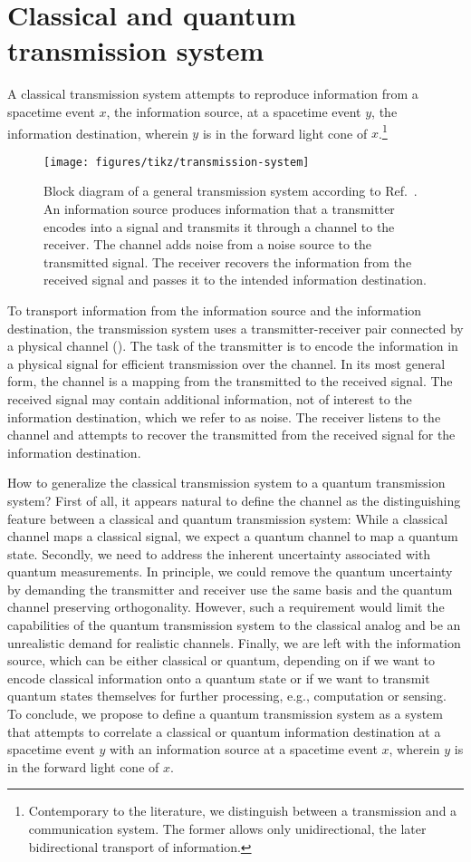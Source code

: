 \section{Classical and quantum transmission system}

A classical transmission system attempts to reproduce information from a spacetime event $x$, the information source, at a spacetime event $y$, the information destination, wherein $y$ is in the forward light cone of $x$.\footnote{Contemporary to the literature, we distinguish between a transmission and a communication system. The former allows only unidirectional, the later bidirectional transport of information.}
\begin{figure}[htb]
	\centering
	\texttt{[image: figures/tikz/transmission-system]}
	\caption{Block diagram of a general transmission system according to Ref.~\cite{Shannon1948}. An information source produces information that a transmitter encodes into a signal and transmits it through a channel to the receiver. The channel adds noise from a noise source to the transmitted signal. The receiver recovers the information from the received signal and passes it to the intended information destination.}\label{fig:transmission_system}
\end{figure}
To transport information from the information source and the information destination, the transmission system uses a transmitter-receiver pair connected by a physical channel ().
The task of the transmitter is to encode the information in a physical signal for efficient transmission over the channel.
In its most general form, the channel is a mapping from the transmitted to the received signal.
The received signal may contain additional information, not of interest to the information destination, which we refer to as noise.
The receiver listens to the channel and attempts to recover the transmitted from the received signal for the information destination.

How to generalize the classical transmission system to a quantum transmission system?
First of all, it appears natural to define the channel as the distinguishing feature between a classical and quantum transmission system: While a classical channel maps a classical signal, we expect a quantum channel to map a quantum state.
Secondly, we need to address the inherent uncertainty associated with quantum measurements.
In principle, we could remove the quantum uncertainty by demanding the transmitter and receiver use the same basis and the quantum channel preserving orthogonality.
However, such a requirement would limit the capabilities of the quantum transmission system to the classical analog and be an unrealistic demand for realistic channels.
Finally, we are left with the information source, which can be either classical or quantum, depending on if we want to encode classical information onto a quantum state or if we want to transmit quantum states themselves for further processing, e.g., computation or sensing.
To conclude, we propose to define a quantum transmission system as a system that attempts to correlate a classical or quantum information destination at a spacetime event $y$ with an information source at a spacetime event $x$, wherein $y$ is in the forward light cone of $x$.